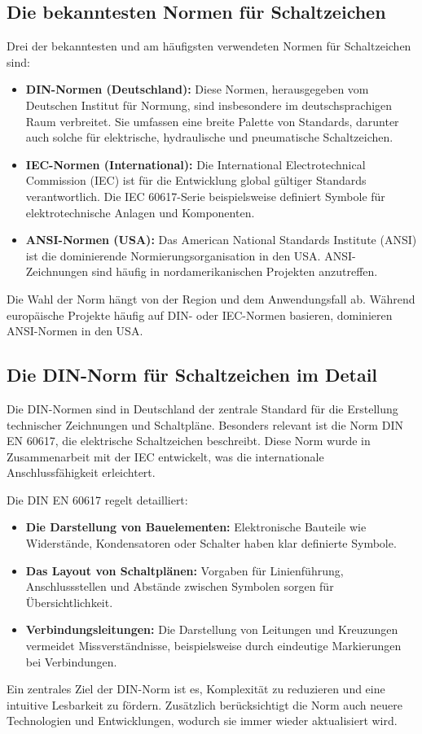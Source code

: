 \subsection*{Die bekanntesten Normen für Schaltzeichen}

Drei der bekanntesten und am häufigsten verwendeten Normen für Schaltzeichen sind:
\begin{itemize}
\item \textbf{DIN-Normen (Deutschland): }Diese Normen, herausgegeben vom Deutschen Institut für Normung, sind insbesondere im deutschsprachigen Raum verbreitet. Sie umfassen eine breite Palette von Standards, darunter auch solche für elektrische, hydraulische und pneumatische Schaltzeichen.
\item \textbf{IEC-Normen (International):} Die International Electrotechnical Commission (IEC) ist für die Entwicklung global gültiger Standards verantwortlich. Die IEC 60617-Serie beispielsweise definiert Symbole für elektrotechnische Anlagen und Komponenten.
\item \textbf{ANSI-Normen (USA): }Das American National Standards Institute (ANSI) ist die dominierende Normierungsorganisation in den USA. ANSI-Zeichnungen sind häufig in nordamerikanischen Projekten anzutreffen.
\end{itemize}
Die Wahl der Norm hängt von der Region und dem Anwendungsfall ab. Während europäische Projekte häufig auf DIN- oder IEC-Normen basieren, dominieren ANSI-Normen in den USA.

\subsection*{Die DIN-Norm für Schaltzeichen im Detail}

Die DIN-Normen sind in Deutschland der zentrale Standard für die Erstellung technischer Zeichnungen und Schaltpläne. Besonders relevant ist die Norm DIN EN 60617, die elektrische Schaltzeichen beschreibt. Diese Norm wurde in Zusammenarbeit mit der IEC entwickelt, was die internationale Anschlussfähigkeit erleichtert.

Die DIN EN 60617 regelt detailliert:
\begin{itemize}
	\item \textbf{Die Darstellung von Bauelementen:} Elektronische Bauteile wie Widerstände, Kondensatoren oder Schalter haben klar definierte Symbole.
	\item \textbf{Das Layout von Schaltplänen:} Vorgaben für Linienführung, Anschlussstellen und Abstände zwischen Symbolen sorgen für Übersichtlichkeit.
	\item \textbf{Verbindungsleitungen:} Die Darstellung von Leitungen und Kreuzungen vermeidet Missverständnisse, beispielsweise durch eindeutige Markierungen bei Verbindungen.
\end{itemize}
Ein zentrales Ziel der DIN-Norm ist es, Komplexität zu reduzieren und eine intuitive Lesbarkeit zu fördern. Zusätzlich berücksichtigt die Norm auch neuere Technologien und Entwicklungen, wodurch sie immer wieder aktualisiert wird.

